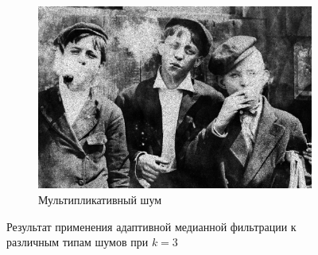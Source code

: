 \begin{figure}[ht!]
\begin{subfigure}[b]{0.5\linewidth}
      \includegraphics[width=0.95\linewidth]{../Adaptive_Median_Filter/Adaptive_Median_Speckle_noise_k=7.jpg} 
      \caption{Мультипликативный шум} 
  \end{subfigure} 
  \caption{Результат применения адаптивной медианной фильтрации к различным типам шумов при $k = 3$}
\end{figure}


